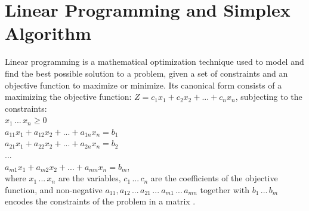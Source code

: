 \documentclass[logo,bsc,singlespacing,parskip]{infthesis}
\begin{document}
\section{Linear Programming and Simplex Algorithm}
\label{simplex}
Linear programming is a mathematical optimization technique used to model and
find the best possible solution to a problem, given a set of constraints and an
objective function to maximize or minimize. Its canonical form consists of a
maximizing the objective function:
\begin{math}
Z = c_1x_1 + c_2x_2 + ... + c_nx_n
\end{math}, subjecting to the constraints: \\
\begin{math}
x_1 \, ... \, x_n \ge 0
\end{math}\\
\begin{math}
a_{11}x_1 + a_{12}x_2 + ... + a_{1n}x_n = b_1 
\end{math}\\
\begin{math}
a_{21}x_1 + a_{22}x_2 + ... + a_{2n}x_n = b_2
\end{math}\\
\begin{math}
...
\end{math}\\
\begin{math}
a_{m1}x_1 + a_{m2}x_2 + ... + a_{mn}x_n = b_m
\end{math}, \\
where \begin{math}x_1 \,...\, x_n\end{math} are the variables, 
\begin{math}c_1 \,...\, c_n\end{math} are the coefficients of the objective function, 
and non-negative \begin{math}a_{11}, a_{12} \,...\, a_{21} \,...\ a_{m1} \,...\, a_{mn}\end{math}
together with \begin{math}b_1 \,...\, b_m\end{math} encodes the constraints of
the problem in a matrix \cite{FPL1}. 

    
\end{document}

